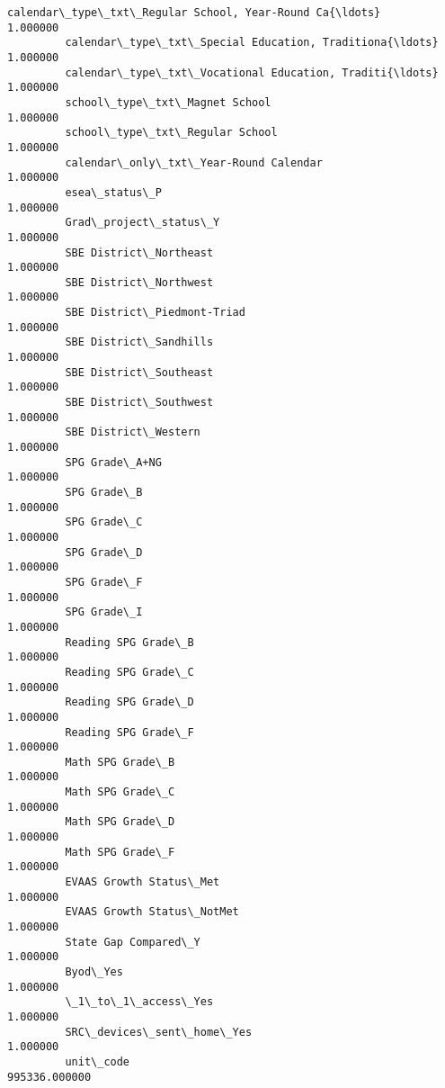 \documentclass[11pt]{article}
\begin{document}
\begin{Verbatim}[commandchars=\\\{\}]
         calendar\_type\_txt\_Regular School, Year-Round Ca{\ldots}       1.000000  
         calendar\_type\_txt\_Special Education, Traditiona{\ldots}       1.000000  
         calendar\_type\_txt\_Vocational Education, Traditi{\ldots}       1.000000  
         school\_type\_txt\_Magnet School                            1.000000  
         school\_type\_txt\_Regular School                           1.000000  
         calendar\_only\_txt\_Year-Round Calendar                    1.000000  
         esea\_status\_P                                            1.000000  
         Grad\_project\_status\_Y                                    1.000000  
         SBE District\_Northeast                                   1.000000  
         SBE District\_Northwest                                   1.000000  
         SBE District\_Piedmont-Triad                              1.000000  
         SBE District\_Sandhills                                   1.000000  
         SBE District\_Southeast                                   1.000000  
         SBE District\_Southwest                                   1.000000  
         SBE District\_Western                                     1.000000  
         SPG Grade\_A+NG                                           1.000000  
         SPG Grade\_B                                              1.000000  
         SPG Grade\_C                                              1.000000  
         SPG Grade\_D                                              1.000000  
         SPG Grade\_F                                              1.000000  
         SPG Grade\_I                                              1.000000  
         Reading SPG Grade\_B                                      1.000000  
         Reading SPG Grade\_C                                      1.000000  
         Reading SPG Grade\_D                                      1.000000  
         Reading SPG Grade\_F                                      1.000000  
         Math SPG Grade\_B                                         1.000000  
         Math SPG Grade\_C                                         1.000000  
         Math SPG Grade\_D                                         1.000000  
         Math SPG Grade\_F                                         1.000000  
         EVAAS Growth Status\_Met                                  1.000000  
         EVAAS Growth Status\_NotMet                               1.000000  
         State Gap Compared\_Y                                     1.000000  
         Byod\_Yes                                                 1.000000  
         \_1\_to\_1\_access\_Yes                                       1.000000  
         SRC\_devices\_sent\_home\_Yes                                1.000000  
         unit\_code                                           995336.000000  
\end{Verbatim}
            
\end{document}
